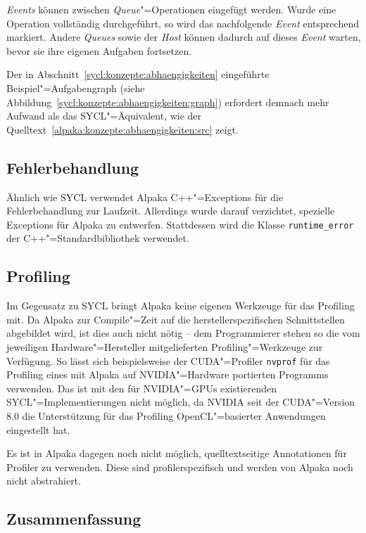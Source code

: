 \textit{Events} können zwischen \textit{Queue}"=Operationen eingefügt werden.
Wurde eine Operation vollständig durchgeführt, so wird das nachfolgende
\textit{Event} entsprechend markiert. Andere \textit{Queues} sowie der
\textit{Host} können dadurch auf dieses \textit{Event} warten, bevor sie ihre
eigenen Aufgaben fortsetzen.

Der in Abschnitt~\ref{sycl:konzepte:abhaengigkeiten} eingeführte
Beispiel"=Aufgabengraph (siehe
Abbildung~\ref{sycl:konzepte:abhaengigkeiten:graph}) erfordert demnach mehr
Aufwand als das SYCL"=Äquivalent, wie der
Quelltext~\ref{alpaka:konzepte:abhaengigkeiten:src} zeigt.

\subsection{Fehlerbehandlung}

Ähnlich wie SYCL verwendet Alpaka C++"=Exceptions für die Fehlerbehandlung zur
Laufzeit. Allerdings wurde darauf verzichtet, spezielle Exceptions für Alpaka
zu entwerfen. Stattdessen wird die Klasse \texttt{runtime\_error} der
C++"=Standardbibliothek verwendet.

\subsection{Profiling}

Im Gegensatz zu SYCL bringt Alpaka keine eigenen Werkzeuge für das Profiling
mit. Da Alpaka zur Compile"=Zeit auf die herstellerspezifischen Schnittstellen
abgebildet wird, ist dies auch nicht nötig -- dem Programmierer stehen so die
vom jeweiligen Hardware"=Hersteller mitgelieferten Profiling"=Werkzeuge zur
Verfügung. So lässt sich beispielsweise der CUDA"=Profiler \texttt{nvprof} für
das Profiling eines mit Alpaka auf NVIDIA"=Hardware portierten Programms
verwenden. Das ist mit den für NVIDIA"=GPUs existierenden
SYCL"=Implementierungen nicht möglich, da NVIDIA seit der CUDA"=Version 8.0 die
Unterstützung für das Profiling OpenCL"=basierter Anwendungen eingestellt hat.

Es ist in Alpaka dagegen noch nicht möglich, quelltextseitige Annotationen für
Profiler zu verwenden. Diese sind profilerspezifisch und werden von Alpaka noch
nicht abstrahiert.

\subsection{Zusammenfassung}

